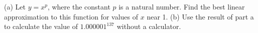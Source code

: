 (a) Let $y=x^p$, where the constant $p$ is a natural number.
Find the best linear approximation to this function for values of
$x$ near 1.\answercheck\hwendpart
(b) Use the result of part a to calculate the value of
$1.000001^137$ without a calculator.\answercheck\hwendpart
